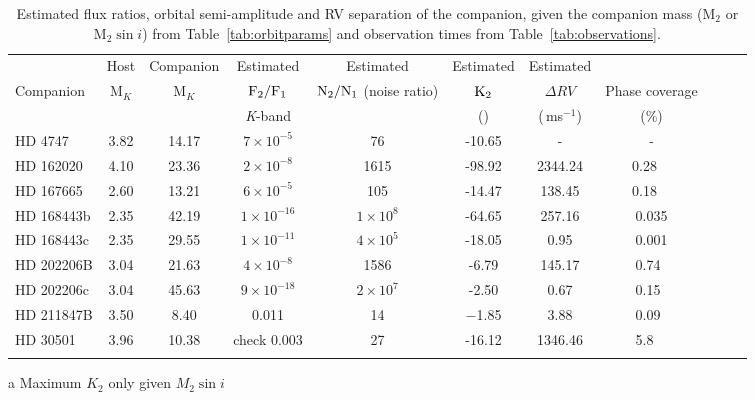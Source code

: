\begin{table*}
        \small
        \centering
       \begin{threeparttable}[b]
        \caption{Estimated flux ratios, orbital semi-amplitude and RV separation of the companion, given the companion mass (\(\textrm{M}_{2}\) or \(\textrm{M}_{2} \sin{i}\)) from Table~\ref{tab:orbitparams} and observation times from Table~\ref{tab:observations}.} 
        \begin{tabular}{l | c c c c c c c | c c c}%
            \toprule
            & Host& Companion &  Estimated  & Estimated &  Estimated & Estimated &  &    \\  %
            Companion & M$_{K}$ & M$_{K}$ & \(\rm F_{2}/F_{1} \)   & \(\rm N_{2}/N_{1} \) (noise ratio) & \(\rm K_2\) &   \(\Delta RV\) & Phase coverage \\
            & & & \textit{K}-band     & & (\kmps{}) & (\,ms\(^{-1}\)) & (\%) \\
            \midrule
            {HD 4747}        & 3.82 & 14.17 & \(7\times10^{-5} \)   & 76 &  -10.65 & -  &  -  \\  %
            {HD 162020}    & 4.10 & 23.36 & \(2\times10^{-8} \)   & 1615  &  -98.92\tnote{a} &  2344.24     & 0.28~~  \\  %
            {HD 167665}    & 2.60 & 13.21 & \(6\times10^{-5} \)   &  105    &  -14.47\tnote{a}  &   138.45     & 0.18~~  \\  %
            {HD 168443b}  & 2.35 & 42.19 & \(1\times10^{-16} \)  &    \(1\times10^{8} \)   &  -64.65\tnote{a}&   257.16   & 0.035 \\ 
            {HD 168443c}  & 2.35 & 29.55 & \(1\times10^{-11} \)  &   \(4\times10^{5} \)     &  -18.05\tnote{a}  &   0.95   &  0.001 \\  %
            {HD 202206}B  & 3.04& 21.63 & \(4\times10^{-8} \)  &   1586 &  -6.79 & 145.17   & 0.74~  \\  %
            {HD 202206}c   & 3.04& 45.63 & \(9\times10^{-18}\)   &     \(2\times10^{7} \) &   -2.50     &   0.67     &  0.15~  \\  %
            {HD 211847}B  & 3.50 & 8.40 &  0.011 &  14   & $-$1.85 & 3.88   & 0.09~  \\  %
            {HD 30501}      & 3.96 & 10.38 & check 0.003  &  27  &  -16.12    &  1346.46      & 5.8~~  \\
            \bottomrule& & 
            \end{tabular}
            \label{tab:estimatedparameters}
    \begin{tablenotes}
        \item[a] {Maximum \(K_2\) only given \(M_2 \sin{i}\)}
      \end{tablenotes}
  \end{threeparttable}

\end{table*}